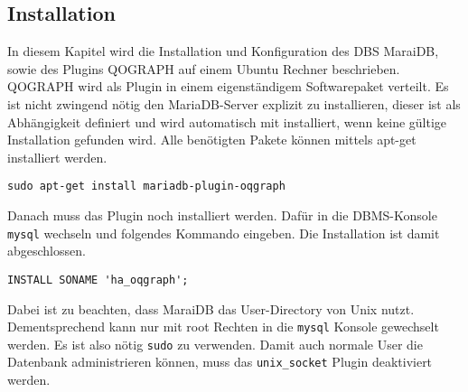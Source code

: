 \subsection{Installation}
In diesem Kapitel wird die Installation und Konfiguration des DBS MaraiDB, sowie des Plugins QOGRAPH auf einem Ubuntu Rechner beschrieben.  
QOGRAPH wird als Plugin in einem eigenständigem Softwarepaket verteilt. Es ist nicht zwingend nötig den MariaDB-Server explizit zu installieren, dieser ist als Abhängigkeit definiert und wird automatisch mit installiert, wenn keine gültige Installation gefunden wird. Alle benötigten Pakete können mittels apt-get installiert werden.
\begin{lstlisting}
sudo apt-get install mariadb-plugin-oqgraph
\end{lstlisting}
Danach muss das Plugin noch installiert werden. Dafür in die DBMS-Konsole \texttt{mysql} wechseln und folgendes Kommando eingeben. Die Installation ist damit abgeschlossen.
\begin{lstlisting}
INSTALL SONAME 'ha_oqgraph';
\end{lstlisting}

Dabei ist zu beachten, dass MaraiDB das User-Directory von Unix nutzt. Dementsprechend kann nur mit root Rechten in die \texttt{mysql} Konsole  gewechselt werden. Es ist also nötig \texttt{sudo} zu verwenden. Damit auch normale User die Datenbank administrieren können, muss das \texttt{unix\_socket} Plugin deaktiviert werden.

